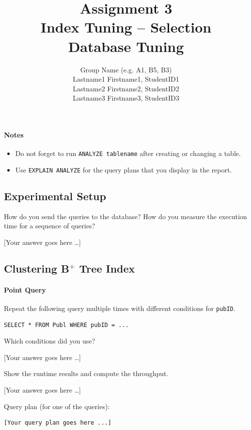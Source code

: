 \documentclass[11pt]{scrartcl}
\title{
  \textbf{\large Assignment 3} \\
  Index Tuning -- Selection \\
  {\large Database Tuning}}
\author{
  Group Name (e.g. A1, B5, B3) \\
  \large Lastname1 Firstname1, StudentID1 \\
  \large Lastname2 Firstname2, StudentID2 \\
  \large Lastname3 Firstname3, StudentID3
}
\newcommand{\youranswerhere}{[Your answer goes here \ldots]}
\begin{document}
\maketitle

\paragraph{Notes}

\begin{itemize}
  \item Do not forget to run \lstinline[style=dbtsql]{ANALYZE tablename} after creating or changing a table.
  \item Use \lstinline[style=dbtsql]{EXPLAIN ANALYZE} for the query plans that you display in the report.
\end{itemize}

\subsection*{Experimental Setup}

How do you send the queries to the database? How do you measure the execution time for a sequence of queries?

\youranswerhere{}

\subsection*{Clustering B$^+$ Tree Index}

\paragraph{Point Query}

Repeat the following query multiple times with different conditions for \texttt{pubID}.

\begin{lstlisting}[style=dbtsql]
SELECT * FROM Publ WHERE pubID = ...
\end{lstlisting}

Which conditions did you use?

\youranswerhere{}

Show the runtime results and compute the throughput.

\youranswerhere{}

Query plan (for one of the queries):

{\small
\parskip0pt\begin{verbatim}
[Your query plan goes here ...]
\end{verbatim}}
\end{document}
